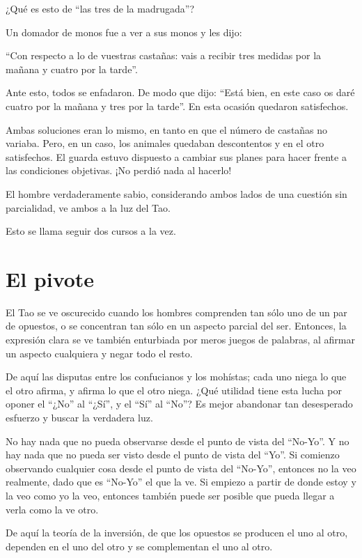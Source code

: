 \documentclass[hidelinks]{memoir}
\begin{document}
	¿Qué es esto de ``las tres de la madrugada''?
	
	Un domador de monos fue a ver a sus monos y les dijo:
	
	``Con respecto a lo de vuestras castañas: vais a recibir tres medidas
	por la mañana y cuatro por la tarde''.
	
	Ante esto, todos se enfadaron. De modo que dijo: ``Está bien, en este
	caso os daré cuatro por la mañana y tres por la tarde''. En esta ocasión
	quedaron satisfechos.
	
	Ambas soluciones eran lo mismo, en tanto en que el número de castañas no
	variaba. Pero, en un caso, los animales quedaban descontentos y en el
	otro satisfechos. El guarda estuvo dispuesto a cambiar sus planes para
	hacer frente a las condiciones objetivas. ¡No perdió nada al hacerlo!
	
	El hombre verdaderamente sabio, considerando ambos lados de una cuestión
	sin parcialidad, ve ambos a la luz del Tao.
	
	Esto se llama seguir dos cursos a la vez.
	
	\chapter*{El pivote}
	
	El Tao se ve oscurecido cuando los hombres comprenden tan sólo uno de un
	par de opuestos, o se concentran tan sólo en un aspecto parcial del ser.
	Entonces, la expresión clara se ve también enturbiada por meros juegos
	de palabras, al afirmar un aspecto cualquiera y negar todo el resto.
	
	De aquí las disputas entre los confucianos y los mohístas; cada uno
	niega lo que el otro afirma, y afirma lo que el otro niega. ¿Qué
	utilidad tiene esta lucha por oponer el ``¿No'' al ``¿Sí'', y el ``Sí''
	al ``No''? Es mejor abandonar tan desesperado esfuerzo y buscar la
	verdadera luz.
	
	No hay nada que no pueda observarse desde el punto de vista del
	``No-Yo''. Y no hay nada que no pueda ser visto desde el punto de vista
	del ``Yo''. Si comienzo observando cualquier cosa desde el punto de
	vista del ``No-Yo'', entonces no la veo realmente, dado que es ``No-Yo''
	el que la ve. Si empiezo a partir de donde estoy y la veo como yo la
	veo, entonces también puede ser posible que pueda llegar a verla como la
	ve otro.
	
	De aquí la teoría de la inversión, de que los opuestos se producen el
	uno al otro, dependen en el uno del otro y se complementan el uno al
	otro.
	
\end{document}

